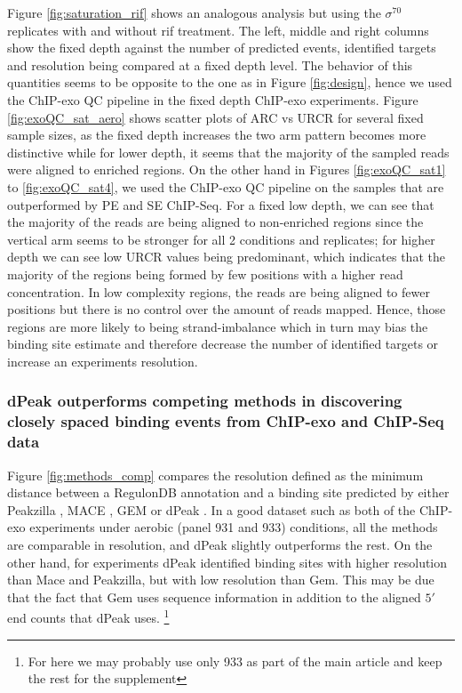 \documentclass{bmcart}\usepackage[]{graphicx}\usepackage[]{color}
\newcommand{\sig}{\sigma^{70}}
\begin{document}
Figure \ref{fig:saturation_rif} shows an analogous analysis but using
the $\sig$ replicates with and without rif treatment. The left, middle
and right columns show the fixed depth against the number of predicted
events, identified targets and resolution being compared at a fixed
depth level. The behavior of this quantities seems to be opposite to
the one as in Figure \ref{fig:design}, hence we used the ChIP-exo QC
pipeline in the fixed depth ChIP-exo experiments. Figure
\ref{fig:exoQC_sat_aero} shows scatter plots of ARC vs URCR for
several fixed sample sizes, as the fixed depth increases the two arm
pattern becomes more distinctive while for lower depth, it seems that
the majority of the sampled reads were aligned to enriched regions. On
the other hand in Figures \ref{fig:exoQC_sat1} to
\ref{fig:exoQC_sat4}, we used the ChIP-exo QC pipeline on the samples
that are outperformed by PE and SE ChIP-Seq. For a fixed low depth, we
can see that the majority of the reads are being aligned to
non-enriched regions since the vertical arm seems to be stronger for
all 2 conditions and replicates; for higher depth we can see low URCR
values being predominant, which indicates that the majority of the
regions being formed by few positions with a higher read
concentration. In low complexity regions, the reads are being aligned
to fewer positions but there is no control over the amount of reads
mapped. Hence, those regions are more likely to being strand-imbalance
which in turn may bias the binding site estimate and therefore
decrease the number of identified targets or increase an experiments
resolution.


\subsubsection{dPeak outperforms competing methods in discovering closely
  spaced binding events from ChIP-exo and ChIP-Seq data}

Figure \ref{fig:methods_comp} compares the resolution defined as the
minimum distance between a RegulonDB annotation and a binding site
predicted by either Peakzilla \cite{peakzilla}, MACE \cite{mace}, GEM
\cite{gem} or dPeak \cite{dpeak}. In a good dataset such as both of
the ChIP-exo experiments under aerobic (panel 931 and 933) conditions,
all the methods are comparable in resolution, and dPeak slightly
outperforms the rest. On the other hand, for experiments dPeak
identified binding sites with higher resolution than Mace and
Peakzilla, but with low resolution than Gem. This may be due that the
fact that Gem uses sequence information in addition to the aligned
$5\prime$ end counts that dPeak uses. 
 \footnote{For here we may
  probably use only 933 as part of the main article and keep the rest
  for the supplement}
\end{document}
